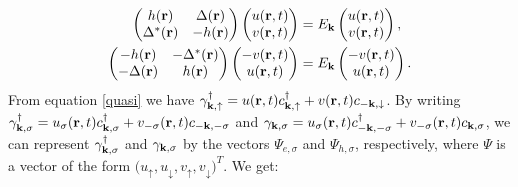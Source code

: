 \begin{equation}
\begin{split}
    \begin{pmatrix}
        h(\mathbf{r}) & \Delta(\mathbf{r}) \\
        \Delta^*(\mathbf{r}) & -h(\mathbf{r})
    \end{pmatrix}
    \begin{pmatrix}
        u(\mathbf{r},t) \\ v(\mathbf{r},t)
    \end{pmatrix}
    &=E_{\mathbf{k}}
    \begin{pmatrix}
        u(\mathbf{r},t) \\ v(\mathbf{r},t)
    \end{pmatrix},
    \\
    \begin{pmatrix}
        -h(\mathbf{r}) & -\Delta^*(\mathbf{r}) \\
        -\Delta(\mathbf{r}) & h(\mathbf{r})
    \end{pmatrix}
    \begin{pmatrix}
        -v(\mathbf{r},t) \\ u(\mathbf{r},t)
    \end{pmatrix}
    &=E_{\mathbf{k}}
    \begin{pmatrix}
        -v(\mathbf{r},t) \\ u(\mathbf{r},t)
    \end{pmatrix}.
\end{split}
\label{BdG-1}
\end{equation}
From equation \eqref{quasi} we have $\gamma_{\bf{k},\uparrow}^{\dagger} = u(\mathbf{r},t)c_{\bf{k},\uparrow}^{\dagger} + v(\mathbf{r},t)c_{-\bf{k},\downarrow}$. By writing $\gamma_{\bf{k},\sigma}^{\dagger} = u_{\sigma}(\mathbf{r},t)c_{\bf{k},\sigma}^{\dagger} + v_{-\sigma}(\mathbf{r},t)c_{-\mathbf{k},-\sigma}$ and $\gamma_{\bf{k},\sigma} = u_{\sigma}(\mathbf{r},t)c_{-\mathbf{k},-\sigma}^{\dagger} + v_{-\sigma}(\mathbf{r},t)c_{\bf{k},\sigma}$, we can represent $\gamma_{\bf{k},\sigma}^{\dagger}$  and $\gamma_{\bf{k},\sigma}$ by the vectors $\Psi_{e,\sigma}$ and $\Psi_{h,\sigma}$, respectively, where $\Psi$ is a vector of the form $\big(u_{\uparrow}, u_{\downarrow}, v_{\uparrow}, v_{\downarrow}\big)^T$. We get:
